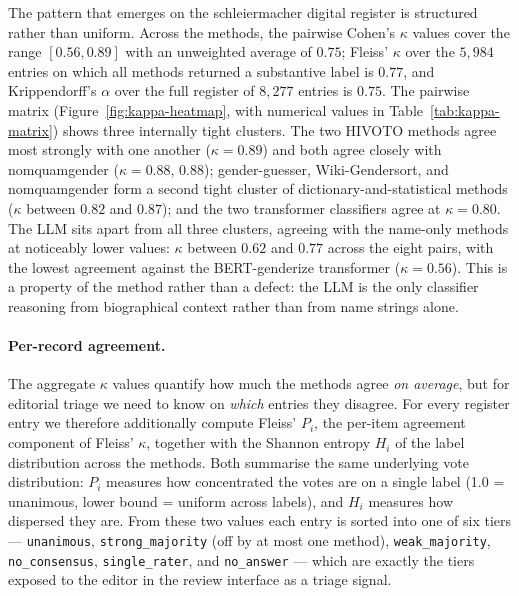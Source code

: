 \documentclass{eceasst}
\begin{document}
The pattern that emerges on the schleiermacher digital register is structured rather than uniform. Across the methods, the pairwise Cohen's $\kappa$ values cover the range $[0.56, 0.89]$ with an unweighted average of $0.75$; Fleiss' $\kappa$ over the $5{,}984$ entries on which all methods returned a substantive label is $0.77$, and Krippendorff's $\alpha$ over the full register of $8{,}277$ entries is $0.75$. The pairwise matrix (Figure~\ref{fig:kappa-heatmap}, with numerical values in Table~\ref{tab:kappa-matrix}) shows three internally tight clusters. The two HIVOTO methods agree most strongly with one another ($\kappa = 0.89$) and both agree closely with nomquamgender ($\kappa = 0.88$, $0.88$); gender-guesser, Wiki-Gendersort, and nomquamgender form a second tight cluster of dictionary-and-statistical methods ($\kappa$ between $0.82$ and $0.87$); and the two transformer classifiers agree at $\kappa = 0.80$. The LLM sits apart from all three clusters, agreeing with the name-only methods at noticeably lower values: $\kappa$ between $0.62$ and $0.77$ across the eight pairs, with the lowest agreement against the BERT-genderize transformer ($\kappa = 0.56$). This is a property of the method rather than a defect: the LLM is the only classifier reasoning from biographical context rather than from name strings alone.



\paragraph{Per-record agreement.}
The aggregate $\kappa$ values quantify how much the methods agree \emph{on average}, but for editorial triage we need to know on \emph{which} entries they disagree. For every register entry we therefore additionally compute Fleiss' $P_i$, the per-item agreement component of Fleiss' $\kappa$, together with the Shannon entropy $H_i$ of the label distribution across the methods. Both summarise the same underlying vote distribution: $P_i$ measures how concentrated the votes are on a single label (1.0 = unanimous, lower bound = uniform across labels), and $H_i$ measures how dispersed they are. From these two values each entry is sorted into one of six tiers --- \texttt{unanimous}, \texttt{strong\_majority} (off by at most one method), \texttt{weak\_majority}, \texttt{no\_consensus}, \texttt{single\_rater}, and \texttt{no\_answer} --- which are exactly the tiers exposed to the editor in the review interface as a triage signal.
\end{document}
